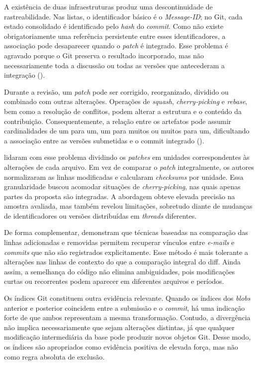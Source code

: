 A existência de duas infraestruturas produz uma descontinuidade de rastreabilidade. Nas listas, o identificador básico é o \textit{Message-ID}; no Git, cada estado consolidado é identificado pelo \textit{hash} do \textit{commit}. Como não existe obrigatoriamente uma referência persistente entre esses identificadores, a associação pode desaparecer quando o \textit{patch} é integrado. Esse problema é agravado porque o Git preserva o resultado incorporado, mas não necessariamente toda a discussão ou todas as versões que antecederam a integração (\cite{ramsauer2019list}).

Durante a revisão, um \textit{patch} pode ser corrigido, reorganizado, dividido ou combinado com outras alterações. Operações de \textit{squash}, \textit{cherry-picking} e \textit{rebase}, bem como a resolução de conflitos, podem alterar a estrutura e o conteúdo da contribuição. Consequentemente, a relação entre os artefatos pode assumir cardinalidades de um para um, um para muitos ou muitos para um, dificultando a associação entre as versões submetidas e o commit integrado (\cite{ramsauer2019list}).

\cite{jiang2013patch} lidaram com esse problema dividindo os \textit{patches} em unidades correspondentes às alterações de cada arquivo. Em vez de comparar o \textit{patch} integralmente, os autores normalizaram as linhas modificadas e calcularam \textit{checksums} por unidade. Essa granularidade buscou acomodar situações de \textit{cherry-picking}, nas quais apenas partes da proposta são integradas. A abordagem obteve elevada precisão na amostra avaliada, mas também revelou limitações, sobretudo diante de mudanças de identificadores ou versões distribuídas em \textit{threads} diferentes. 

De forma complementar, \cite{jiang2014tracing} demonstram que técnicas baseadas na comparação das linhas adicionadas e removidas permitem recuperar vínculos entre \textit{e-mails} e \textit{commits} que não são registrados explicitamente. Esse método é mais tolerante a alterações nas linhas de contexto do que a comparação integral do diff. Ainda assim, a semelhança do código não elimina ambiguidades, pois modificações curtas ou recorrentes podem aparecer em diferentes arquivos e períodos.

Os índices Git constituem outra evidência relevante. Quando os índices dos \textit{blobs} anterior e posterior coincidem entre a submissão e o \textit{commit}, há uma indicação forte de que ambos representam a mesma transformação. Contudo, a divergência não implica necessariamente que sejam alterações distintas, já que qualquer modificação intermediária da base pode produzir novos objetos Git. Desse modo, os índices são apropriados como evidência positiva de elevada força, mas não como regra absoluta de exclusão.


